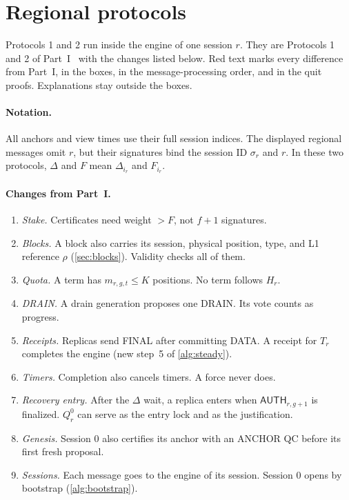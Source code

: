 \documentclass[11pt,a4paper]{article}
\newcommand{\RR}[1]{{\color{rrRed}#1}}
\newcommand{\tagg}[1]{\ensuremath{\mathsf{#1}}}
\newcounter{protocol}
\begin{document}
\section{Regional protocols}
\label{sec:protocols}
Protocols 1 and 2 run inside the engine of one session $r$. They are
Protocols 1 and 2 of Part~I~\cite{part1} with the changes listed below.
\RR{Red text} marks every difference from Part~I, in the boxes, in the
message-processing order, and in the quit proofs. Explanations stay
outside the boxes.

\paragraph{Notation.}
All anchors and view times use their full session indices. The displayed
regional messages omit $r$, but their signatures bind the session ID
$\sigma_r$ and $r$. In these two protocols, $\Delta$ and $F$ mean
$\Delta_{i_r}$ and $F_{i_r}$.

\paragraph{Changes from Part~I.}
\begin{enumerate}[label=\arabic*.]
\item \emph{Stake.} Certificates need weight $>F$, not $f+1$ signatures.
\item \emph{Blocks.} A block also carries its session, physical
position, type, and L1 reference $\rho$ (\cref{sec:blocks}). Validity
checks all of them.
\item \emph{Quota.} A term has $m_{r,g,t}\le K$ positions. No term follows
$H_r$.
\item \emph{DRAIN.} A drain generation proposes one DRAIN. Its vote
counts as progress.
\item \emph{Receipts.} Replicas send FINAL after committing DATA. A
receipt for $T_r$ completes the engine (new step~5 of \cref{alg:steady}).
\item \emph{Timers.} Completion also cancels timers. A force never does.
\item \emph{Recovery entry.} After the $\Delta$ wait, a replica enters
when $\tagg{AUTH}_{r,g+1}$ is finalized. $Q_r^0$ can serve as the entry
lock and as the justification.
\item \emph{Genesis.} Session $0$ also certifies its anchor with an
ANCHOR QC before its first fresh proposal.
\item \emph{Sessions.} Each message goes to the engine of its session.
Session $0$ opens by bootstrap (\cref{alg:bootstrap}).
\end{enumerate}
\end{document}
